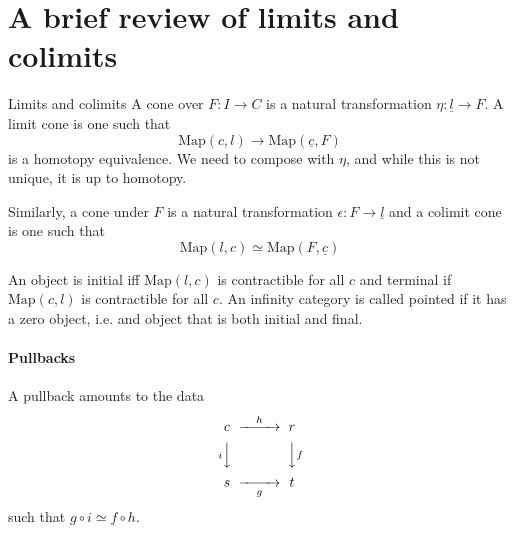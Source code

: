 




\newpage
\section{A brief review of limits and colimits}

\begin{definition}{Limits and colimits}{}
    A cone over $F:I\rightarrow C$ is a natural transformation $\eta:\underline{l}\rightarrow F$. A limit cone is one such that $$\mathrm{Map}(c,l)\rightarrow \mathrm{Map}(\underline{c},F)$$ is a homotopy equivalence. We need to compose with $\eta$, and while this is not unique, it is up to homotopy.

    Similarly, a cone under $F$ is a natural transformation $\epsilon:F\rightarrow \underline{l}$ and a colimit cone is one such that $$\mathrm{Map}(l,c)\simeq \mathrm{Map}(F,\underline{c})$$
    
\end{definition}

An object is initial iff $\mathrm{Map}(l,c)$ is contractible for all $c$ and terminal if $\mathrm{Map}(c,l)$ is contractible for all $c$. An infinity category is called pointed if it has a zero object, i.e. and object that is both initial and final.

\paragraph*{Pullbacks}

A pullback amounts to the data $$\begin{CD}
    c @> h> > r \\
    @ViVV @VVfV \\
    s @> > g> t
\end{CD}$$
such that $g\circ i \simeq f\circ h$.

